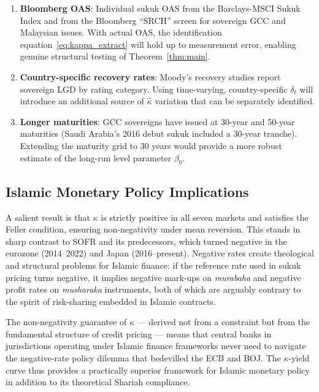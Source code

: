 \documentclass[12pt]{article}
\theoremstyle{plain}
\theoremstyle{definition}
\theoremstyle{remark}
\begin{document}
\begin{enumerate}[noitemsep]
\item \textbf{Bloomberg OAS}: Individual sukuk OAS from the Barclays-MSCI
  Sukuk Index and from the Bloomberg ``SRCH'' screen for sovereign GCC and
  Malaysian issues. With actual OAS, the identification
  equation~\eqref{eq:kappa_extract} will hold up to measurement error, enabling
  genuine structural testing of Theorem~\ref{thm:main}.

\item \textbf{Country-specific recovery rates}: Moody's recovery studies report
  sovereign LGD by rating category. Using time-varying, country-specific
  $\delta_t$ will introduce an additional source of $\hat{\kappa}$ variation
  that can be separately identified.

\item \textbf{Longer maturities}: GCC sovereigns have issued at 30-year and
  50-year maturities (Saudi Arabia's 2016 debut sukuk included a 30-year
  tranche). Extending the maturity grid to 30 years would provide a more
  robust estimate of the long-run level parameter $\beta_0$.
\end{enumerate}

\subsection{Islamic Monetary Policy Implications}

A salient result is that $\kappa$ is strictly positive in all seven markets
and satisfies the Feller condition, ensuring non-negativity under mean
reversion. This stands in sharp contrast to SOFR and its predecessors, which
turned negative in the eurozone (2014--2022) and Japan (2016--present).
Negative rates create theological and structural problems for Islamic finance:
if the reference rate used in sukuk pricing turns negative, it implies
negative mark-ups on \emph{murabaha} and negative profit rates on
\emph{musharaka} instruments, both of which are arguably contrary to the
spirit of risk-sharing embedded in Islamic contracts.

The non-negativity guarantee of $\kappa$ --- derived not from a constraint but
from the fundamental structure of credit pricing --- means that central banks
in jurisdictions operating under Islamic finance frameworks never need to
navigate the negative-rate policy dilemma that bedevilled the ECB and BOJ.
The $\kappa$-yield curve thus provides a practically superior framework for
Islamic monetary policy in addition to its theoretical Shariah compliance.
\end{document}
